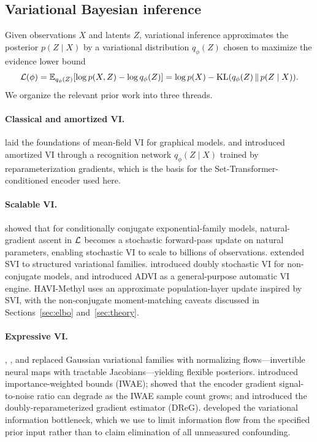 \subsection{Variational Bayesian inference}
Given observations $X$ and latents $Z$, variational inference \citep{jordan1999,wainwright2008} approximates the posterior $p(Z\mid X)$ by a variational distribution $q_\phi(Z)$ chosen to maximize the evidence lower bound
\begin{equation}
\mathcal{L}(\phi) = \mathbb{E}_{q_\phi(Z)}[\log p(X,Z) - \log q_\phi(Z)] = \log p(X) - \mathrm{KL}(q_\phi(Z)\,\|\,p(Z\mid X)).
\label{eq:elbo-canonical}
\end{equation}
We organize the relevant prior work into three threads.

\paragraph{Classical and amortized VI.} \citet{jordan1999,wainwright2008,blei2017vi} laid the foundations of mean-field VI for graphical models. \citet{kingma2014vae} and \citet{rezende2014} introduced amortized VI through a recognition network $q_\phi(Z\mid X)$ trained by reparameterization gradients, which is the basis for the Set-Transformer-conditioned encoder used here.

\paragraph{Scalable VI.} \citet{hoffman2013svi} showed that for conditionally conjugate exponential-family models, natural-gradient ascent in $\mathcal{L}$ becomes a stochastic forward-pass update on natural parameters, enabling stochastic VI to scale to billions of observations. \citet{hoffmanblei2015ssvi} extended SVI to structured variational families. \citet{titsias2014doublystoch} introduced doubly stochastic VI for non-conjugate models, and \citet{kucukelbir2017advi} introduced ADVI as a general-purpose automatic VI engine. HAVI-Methyl uses an approximate population-layer update inspired by SVI, with the non-conjugate moment-matching caveats discussed in Sections~\ref{sec:elbo} and~\ref{sec:theory}.

\paragraph{Expressive VI.} \citet{rezende2015flows}, \citet{kingma2016iaf}, and \citet{durkan2019nsf} replaced Gaussian variational families with normalizing flows---invertible neural maps with tractable Jacobians---yielding flexible posteriors. \citet{burda2016iwae} introduced importance-weighted bounds (IWAE); \citet{rainforth2018iwaeSNR} showed that the encoder gradient signal-to-noise ratio can degrade as the IWAE sample count grows; and \citet{tucker2019dreg} introduced the doubly-reparameterized gradient estimator (DReG). \citet{alemi2017vib} developed the variational information bottleneck, which we use to limit information flow from the specified prior input rather than to claim elimination of all unmeasured confounding.

